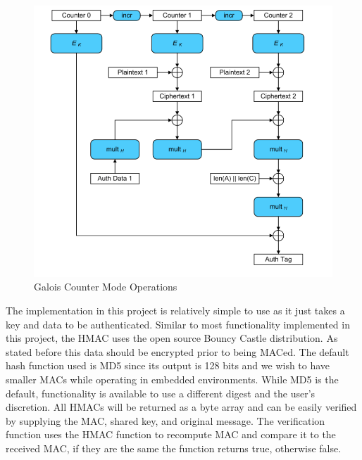  \begin{figure}[t]
	\centering
	\includegraphics[width=12cm,height=0.7\textheight,keepaspectratio]{./figures/figure_6}
	\center\caption[font=footnote]{Galois Counter Mode Operations}
\end{figure}

The implementation in this project is relatively simple to use as it just takes a key and data to be authenticated. Similar to most functionality implemented in this project, the HMAC uses the open source Bouncy Castle distribution. As stated before this data should be encrypted prior to being MACed. The  default hash function used is MD5 since its output is 128 bits and we wish to have smaller MACs while operating in embedded environments. While MD5 is the default, functionality is available to use a different digest and the user's discretion. All HMACs will be returned as a byte array and can be easily verified by supplying the MAC, shared key, and original message. The verification function uses the HMAC function to recompute MAC and compare it to the received MAC, if they are the same the function returns true, otherwise false. 

